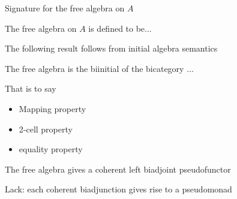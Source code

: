 

\begin{definition}
Signature for the free algebra on $A$

The free algebra on $A$ is defined to be...
\end{definition}

The following result follows from initial algebra semantics

\begin{corollary}
The free algebra is the biinitial of the bicategory ...

That is to say
\begin{itemize}
	\item Mapping property
	\item 2-cell property
	\item equality property
\end{itemize} 
\end{corollary}



\begin{proposition}
The free algebra gives a coherent left biadjoint pseudofunctor
\end{proposition}





\begin{proposition}
Lack: each coherent biadjunction gives rise to a pseudomonad
\end{proposition}